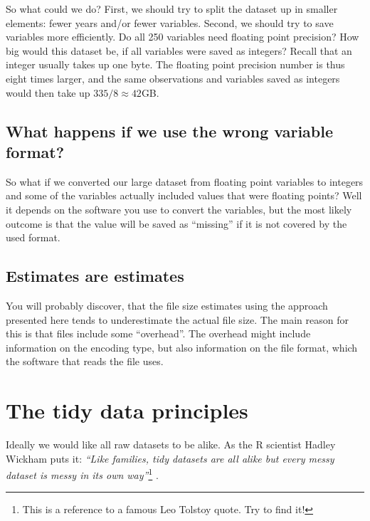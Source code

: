 \documentclass[
]{book}
\begin{document}
So what could we do? First, we should try to split the dataset up in smaller elements: fewer years and/or fewer variables. Second, we should try to save variables more efficiently. Do all 250 variables need floating point precision? How big would this dataset be, if all variables were saved as integers? Recall that an integer usually takes up one byte. The floating point precision number is thus eight times larger, and the same observations and variables saved as integers would then take up \(335/8\approx 42\)GB.

\hypertarget{what-happens-if-we-use-the-wrong-variable-format}{%
\subsection*{What happens if we use the wrong variable format?}\label{what-happens-if-we-use-the-wrong-variable-format}}

So what if we converted our large dataset from floating point variables to integers and some of the variables actually included values that were floating points? Well it depends on the software you use to convert the variables, but the most likely outcome is that the value will be saved as ``missing'' if it is not covered by the used format.

\hypertarget{estimates-are-estimates}{%
\subsection*{Estimates are estimates}\label{estimates-are-estimates}}

You will probably discover, that the file size estimates using the approach presented here tends to underestimate the actual file size. The main reason for this is that files include some ``overhead''. The overhead might include information on the encoding type, but also information on the file format, which the software that reads the file uses.

\hypertarget{the-tidy-data-principles}{%
\section{The tidy data principles}\label{the-tidy-data-principles}}

Ideally we would like all raw datasets to be alike. As the R scientist Hadley Wickham puts it: \emph{``Like families, tidy datasets are all alike but every messy dataset is messy in its own way''}\footnote{This is a reference to a famous Leo Tolstoy quote. Try to find it!} \citet{wickham2014tidy}.
\end{document}

